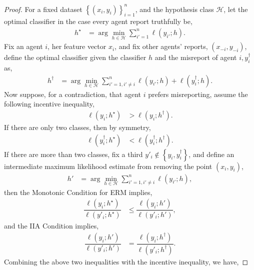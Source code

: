\documentclass{article}
\begin{document}
\begin{proof} \label{proof:marginermpf} 
For a fixed dataset $\left\{\left(x_{i}, y_{i}\right)\right\}_{i=1}^{n}$, and the hypothesis class $\mathcal{H}$, let the optimal classifier in the case every agent report truthfully be,
\begin{align*}
h^\star  &= \arg\displaystyle\min_{h \in \mathcal{H}} \displaystyle\sum_{i'=1}^{n} \ell\left(y_{i'} ; h\right).
\end{align*}
Fix an agent $i $, her feature vector $x_{i}$, and fix other agents' reports, $\left(x_{-i}, y_{-i}\right)$, define the optimal classifier given the classifier $h $ and the misreport of agent $i , y^{\dagger}_{i}$ as,
\begin{align*}
h^{\dagger} &= \arg\displaystyle\min_{h \in \mathcal{H}} \displaystyle\sum_{i'=1, i' \neq  i}^{n} \ell\left(y_{i'} ; h\right) + \ell\left(y^{\dagger}_{i} ; h\right).
\end{align*}
Now suppose, for a contradiction, that agent $i $ prefers misreporting, assume the following incentive inequality,
\begin{align*}
\ell\left(y_{i} ; h^\star \right) &> \ell\left(y_{i} ; h^{\dagger}\right).
\end{align*}
If there are only two classes, then by symmetry,
\begin{align*}
\ell\left(y^{\dagger}_{i} ; h^\star \right) &< \ell\left(y^{\dagger}_{i} ; h^{\dagger}\right).
\end{align*}
If there are more than two classes, fix a third $y'_{i} \notin \left\{y_{i}, y^{\dagger}_{i}\right\}$, and define an intermediate maximum likelihood estimate from removing the point $\left(x_{i}, y_{i}\right)$,
\begin{align*}
h' &= \arg\displaystyle\min_{h \in \mathcal{H}} \displaystyle\sum_{i' = 1, i' \neq  i}^{n} \ell\left(y_{i'} ; h\right),
\end{align*}
then the Monotonic Condition for ERM implies,
\begin{align*}
\dfrac{\ell\left(y_{i} ; h^\star \right)}{\ell\left(y'_{i} ; h^\star \right)} &\leq  \dfrac{\ell\left(y_{i} ; h'\right)}{\ell\left(y'_{i} ; h'\right)},
\end{align*}
and the IIA Condition implies,
\begin{align*}
\dfrac{\ell\left(y_{i} ; h'\right)}{\ell\left(y'_{i} ; h'\right)} &= \dfrac{\ell\left(y_{i} ; h^{\dagger}\right)}{\ell\left(y'_{i} ; h^{\dagger}\right)}.
\end{align*}
Combining the above two inequalities with the incentive inequality, we have,

\end{proof}
\end{document}

